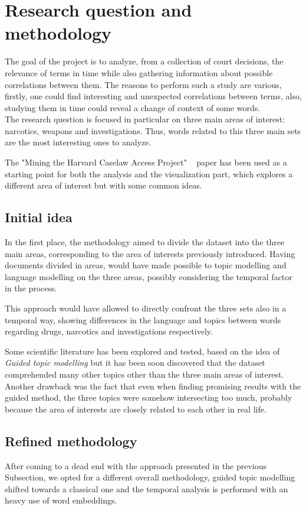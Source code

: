 \section{Research question and methodology}

The goal of the project is to analyze, from a collection 
of court decisions, the relevance of terms in time while 
also gathering information about possible correlations between 
them. The reasons to perform such a study are various, firstly, 
one could find interesting and unexpected correlations between terms, 
also, studying them in time could reveal a change of 
context of some words.\\
The research question is focused in particular on three main areas of interest:
narcotics, weapons and investigations. Thus, words related to this three main sets
are the most interesting ones to analyze.

The "Mining the Harvard Caselaw Access Project" ~\cite{harvard_caselaw} paper has been used as a starting point for
both the analysis and the visualization part, which explores a different area of interest but with some common ideas.

\subsection{Initial idea}
\label{res-med}
In the first place, the methodology aimed to divide the dataset into the three main areas, 
corresponding to the area of interests previously introduced. 
Having documents divided in areas, would have made possible to topic modelling and language modelling on the three areas, possibly considering the temporal factor in the process. 

This approach would have allowed to directly confront the three sets also in a temporal way, showing differences in the language and topics between words regarding drugs, narcotics and investigations respectively.

Some scientific literature has been explored and tested, based on the idea of \emph{Guided topic modelling} 
but it has been soon discovered that the dataset comprehended many other topics other than the
three main areas of interest.~\cite{glda} Another drawback was the fact that even when finding promising results 
with the guided method, the three topics were somehow intersecting too much, probably because the 
area of interests are closely related to each other in real life.

\subsection{Refined methodology}

After coming to a dead end with the approach presented in the previous Subsection, we opted for a different
overall methodology, guided topic modelling shifted towards a classical one and the temporal 
analysis is performed with an heavy use of word embeddings.  